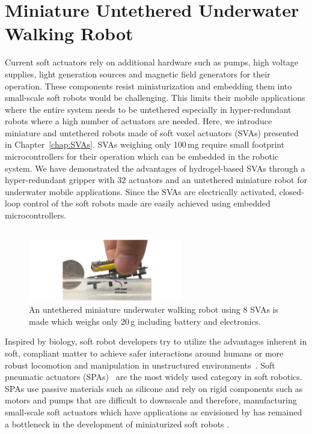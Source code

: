 \graphicspath{{Images/untetheredWalker/}}

\chapter{Miniature Untethered Underwater Walking Robot}
\label{chap:untetheredWalker}
Current soft actuators rely on additional hardware such as pumps, high voltage supplies, light generation sources and magnetic field generators for their operation. 
These components resist miniaturization and embedding them into small-scale soft robots would be challenging. This limits their mobile applications where the entire system needs to be untethered especially in hyper-redundant robots where a high number of actuators are needed. Here, we introduce miniature and untethered robots made of soft voxel actuators (SVAs) presented in Chapter~\ref{chap:SVAs}. SVAs weighing only 100\,mg require small footprint microcontrollers for their operation which can be embedded in the robotic system. We have demonstrated the advantages of hydrogel-based SVAs through a hyper-redundant gripper with 32 actuators and an untethered miniature robot for underwater mobile applications. Since the SVAs are electrically activated, closed-loop control of the soft robots made are easily achieved using embedded microcontrollers.
\section{}

\begin{figure}[!ht]
\centering
\includegraphics[width=0.6\textwidth]{untWalker.pdf}
    \caption[]{An untethered miniature underwater walking robot using 8 SVAs is made which weighs only 20\,g including battery and electronics.}
    \label{fig:untWalker}
\end{figure}

Inspired by biology, soft robot developers try to utilize the advantages inherent in soft, compliant matter to achieve safer interactions around humans or more robust locomotion and manipulation in unstructured environments~\cite{martinez2013,laschi2012,tolley2014b,AdamBilodeau2015}.  
Soft pneumatic actuators (SPAs)~\cite{Gorissen2017, Branyan2018} are the most widely used category in soft robotics. SPAs use passive materials such as silicone and rely on rigid components such as motors and pumps that are difficult to downscale and therefore, manufacturing small-scale soft actuators which have applications as envisioned by \cite{Hines2017} has remained a bottleneck in the development of miniaturized soft robots \cite{Majidi2019}. 


